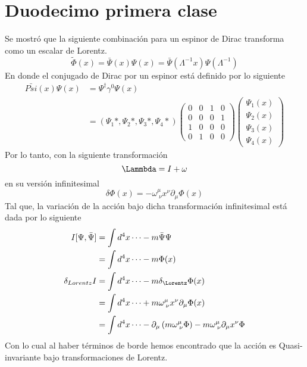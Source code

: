 \documentclass[../main.tex]{subfiles}
\begin{document}
\section{Duodecimo primera clase}
Se mostró que la siguiente combinación para un espinor de Dirac transforma como un escalar de Lorentz.
\begin{equation*}
  \tilde{\Phi}(x)=\bar{\Psi}(x)\Psi(x) = \bar{\Psi}(\Lambda^{-1}x)\Psi(\Lambda^{-1})
\end{equation*}
En donde el conjugado de Dirac por un espinor está definido por lo siguiente
\begin{align*}
  \bar{Psi}(x)\Psi(x) & = \Psi^\dagger \gamma^0 \Psi(x) \\
  & = \left( \Psi_1* , \Psi_2* , \Psi_3* , \Psi_4* \right) \begin{pmatrix}
    0 & 0 & 1 & 0 \\ 0 & 0 & 0 & 1 \\ 1 & 0 & 0 & 0 \\ 0 & 1 & 0 & 0
  \end{pmatrix} \begin{pmatrix}
    \Psi_1(x) \\
    \Psi_2(x) \\
    \Psi_3(x) \\
    \Psi_4(x)
  \end{pmatrix}
\end{align*}
Por lo tanto, con la siguiente transformación
\begin{equation*}
  \Lammbda = I + \omega
\end{equation*}
en su versión infinitesimal
\begin{equation*}
  \delta \Phi(x) = -\omega^\mu_{\; \nu} x^\nu \partial_\mu \Phi(x)
\end{equation*}
Tal que, la variación de la acción bajo dicha transformación infinitesimal está dada por lo siguiente
\begin{align*}
  I[\Psi, \bar{\Psi}] & = \int d^4x \dots -m\bar{\Psi}\Psi \\\
  & = \int d^4x \dots - m\Phi(x) \\
  \delta_{Lorentz}I & = \int d^4x \dots - m\delta_{\Lorentz}\Phi(x) \\
  & = \int d^4x \dots + m\omega^\mu_{\; \nu} x^\nu \partial_\mu \Phi(x) \\
  & = \int d^4x \dots - \partial_\mu \left(m \omega^\mu_{\; \nu} \Phi \right) - m \omega^\mu_{\;\nu} \partial_\mu x^\nu \Phi
\end{align*}
Con lo cual al haber términos de borde hemos encontrado que la acción es Quasi-invariante bajo transformaciones de Lorentz. 
\end{document}
